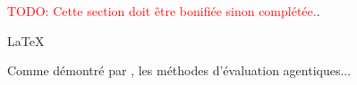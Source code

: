 \documentclass[a4paper,11pt]{article}
\begin{document}
\textcolor{red}{TODO: Cette section doit être bonifiée sinon complétée.}.


\LaTeX{} 


Comme démontré par \cite{xi2023rise}, les méthodes d'évaluation agentiques...

\label{sec:biblio}


\iffalse
Mettre ici des commentaires...
\fi
\end{document}
